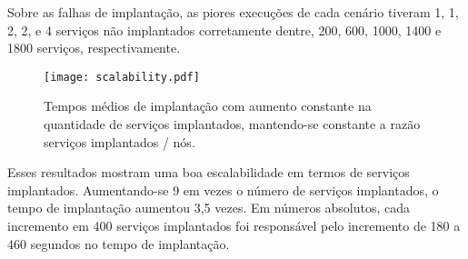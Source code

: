 Sobre as falhas de implantação,
as piores execuções de cada cenário tiveram 1, 1, 2, 2, e 4 serviços não implantados corretamente
dentre, 200, 600, 1000, 1400 e 1800 serviços, respectivamente.

\begin{figure}[h]
  \centering
  \texttt{[image: scalability.pdf]}
  \caption{Tempos médios de implantação com aumento constante na quantidade de serviços implantados, mantendo-se constante a razão serviços implantados / nós.}
  \label{fig:ee_scalability}
\end{figure}

Esses resultados mostram uma boa escalabilidade em termos de serviços implantados.
Aumentando-se 9 em vezes o número de serviços implantados, o tempo de implantação aumentou 3,5 vezes.
Em números absolutos, cada incremento em 400 serviços implantados foi responsável pelo incremento
de 180 a 460 segundos no tempo de implantação.



